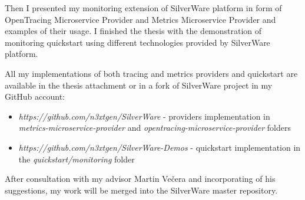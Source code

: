 \documentclass[12pt,oneside]{fithesis2}
\begin{document}
Then I presented my monitoring extension of SilverWare platform in form of OpenTracing Microservice Provider and Metrics Microservice Provider and examples of their usage. I finished the thesis with the demonstration of monitoring quickstart using different technologies provided by SilverWare platform.
 
All my implementations of both tracing and metrics providers and quickstart are available in the thesis attachment or in a fork of SilverWare project in my GitHub account:
\begin{itemize}
\item \textit{https://github.com/n3xtgen/SilverWare} - providers implementation in \textit{metrics-microservice-provider} and \textit{opentracing-microservice-provider} folders
\item \textit{https://github.com/n3xtgen/SilverWare-Demos} - quickstart implementation in the \textit{quickstart/monitoring} folder
\end{itemize}

After consultation with my advisor Martin Večera and incorporating of his suggestions, my work will be merged into the SilverWare master repository.



\end{document}
